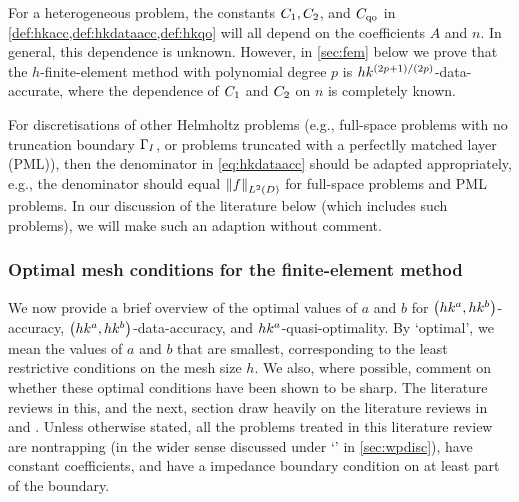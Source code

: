 \label{rem:accuracyhetero}
For a heterogeneous problem, the constants $C_{1}, C_{2}$, and $C_{\mathrm{qo}}$ in \cref{def:hkacc,def:hkdataacc,def:hkqo} will all depend on the coefficients $A$ and $n.$ In general, this dependence is unknown. However, in \cref{sec:fem} below we prove that the $h$-finite-element method with polynomial degree $p$ is $hk^{(2p+1)/(2p)}$-data-accurate, where the dependence of $C_{1}$ and $C_{2}$ on $n$ is completely known.
\ere

For discretisations of other Helmholtz problems (e.g., full-space problems with no truncation boundary $\Gamma_{I}$, or problems truncated with a perfectlly matched layer (PML)), then the denominator in \cref{eq:hkdataacc} should be adapted appropriately, e.g., the denominator should equal $\NLtD{f}$ for full-space problems and PML problems. In our discussion of the literature below (which includes such problems), we will make such an adaption without comment.
\ere




\subsubsection{Optimal mesh conditions for the finite-element method}

We now provide a brief overview of the optimal values of $a$ and $b$ for $\hk{a}{b}$-accuracy, $\hk{a}{b}$-data-accuracy, and $hk^{a}$-quasi-optimality. By `optimal', we mean the values of $a$ and $b$ that are smallest, corresponding to the least restrictive conditions on the mesh size $h$. We also, where possible, comment on whether these optimal conditions have been shown to be sharp. The literature reviews in this, and the next, section draw heavily on the literature reviews in \cite[pp. 182--183]{GrLoMeSp:14} and \cite[p. 112]{DiMoSp:19}. Unless otherwise stated, all the problems treated in this literature review are nontrapping (in the wider sense discussed under `\techtitle' in \cref{sec:wpdisc}), have constant coefficients, and have a impedance boundary condition on at least part of the boundary.


